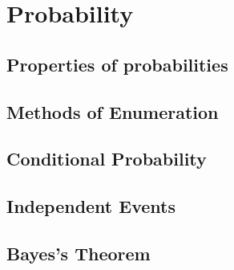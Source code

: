 \documentclass[class=probandstats,crop=false]{standalone}
\begin{document}
\chapter{Probability}

\section{Properties of probabilities}

\section{Methods of Enumeration}

\section{Conditional Probability}

\section{Independent Events}

\section{Bayes's Theorem}
\end{document}
